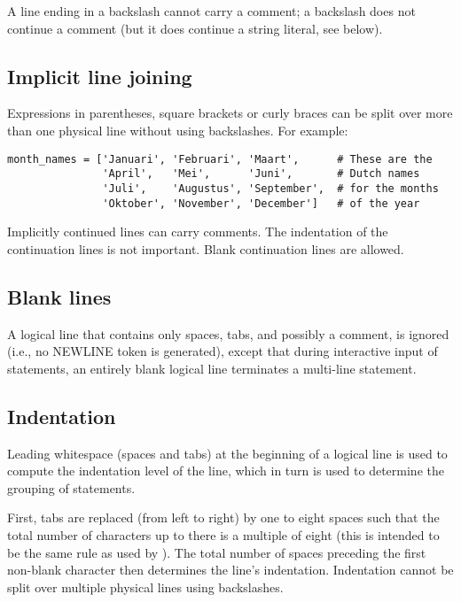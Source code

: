 A line ending in a backslash cannot carry a comment; a backslash does
not continue a comment (but it does continue a string literal, see
below).

\subsection{Implicit line joining}

Expressions in parentheses, square brackets or curly braces can be
split over more than one physical line without using backslashes.
For example:

\begin{verbatim}
month_names = ['Januari', 'Februari', 'Maart',      # These are the
               'April',   'Mei',      'Juni',       # Dutch names
               'Juli',    'Augustus', 'September',  # for the months
               'Oktober', 'November', 'December']   # of the year
\end{verbatim}

Implicitly continued lines can carry comments.  The indentation of the
continuation lines is not important.  Blank continuation lines are
allowed.

\subsection{Blank lines}

A logical line that contains only spaces, tabs, and possibly a
comment, is ignored (i.e., no NEWLINE token is generated), except that
during interactive input of statements, an entirely blank logical line
terminates a multi-line statement.

\subsection{Indentation}

Leading whitespace (spaces and tabs) at the beginning of a logical
line is used to compute the indentation level of the line, which in
turn is used to determine the grouping of statements.

First, tabs are replaced (from left to right) by one to eight spaces
such that the total number of characters up to there is a multiple of
eight (this is intended to be the same rule as used by {\UNIX}).  The
total number of spaces preceding the first non-blank character then
determines the line's indentation.  Indentation cannot be split over
multiple physical lines using backslashes.

